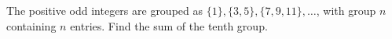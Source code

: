 The positive odd integers are grouped as $\{1\},\{3,5\},\{7,9,11\},\ldots$, with group $n$ containing $n$ entries. Find the sum of the tenth group.
